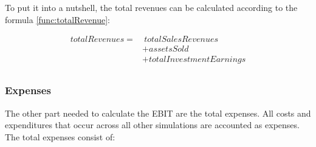 To put it into a nutshell, the total revenues can be calculated according to the formula \ref{func:totalRevenue}:

\begin{equation}
\label{func:totalRevenue}
\begin{aligned}
    totalRevenues = & ~totalSalesRevenues \\
    & + assetsSold \\
    & + totalInvestmentEarnings \\
\end{aligned}
\end{equation}

\subsubsection{Expenses}
The other part needed to calculate the EBIT are the total expenses. All costs and expenditures that occur across all other simulations are accounted as expenses. The total expenses consist of:
